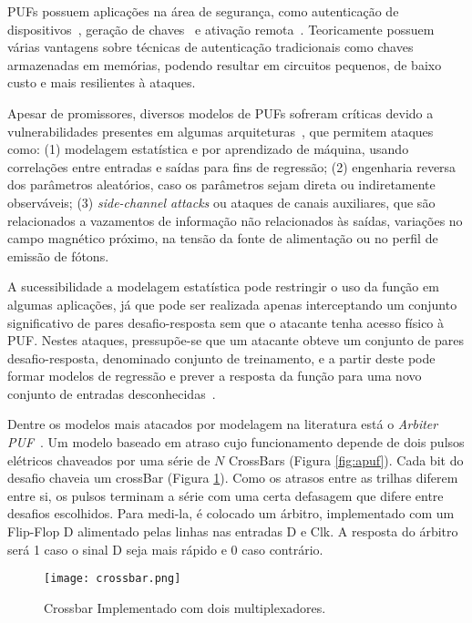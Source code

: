 \documentclass[pdftex,12pt]{article}
\begin{document}
\begin{spacing}{1.5}
PUFs possuem aplicações na área de segurança, como autenticação de dispositivos~\cite{SuhDevadas2007}, geração de chaves~\cite{LeeLGSDD_PUFSecretKey_VLSI04} e ativação remota~\cite{GassendCDD_CCSC02}. Teoricamente possuem várias vantagens sobre técnicas de autenticação tradicionais como chaves armazenadas em memórias, podendo resultar em circuitos pequenos, de baixo custo e mais resilientes à ataques.
    
Apesar de promissores, diversos modelos de PUFs sofreram críticas devido a vulnerabilidades presentes em algumas arquiteturas~\cite{PUFAnalysis, MajzoobiKP09, MajzoobiKP08}, que permitem ataques como: 
(1) modelagem estatística e por aprendizado de máquina, usando correlações entre entradas e saídas para fins de regressão;
(2) engenharia reversa dos parâmetros aleatórios, caso os parâmetros sejam direta ou indiretamente observáveis;
(3) \textit{side-channel attacks} ou ataques de canais auxiliares, que são relacionados a vazamentos de informação não relacionados às saídas, variações no campo magnético próximo, na tensão da fonte de alimentação ou no perfil de emissão de fótons.

A sucessibilidade a modelagem estatística pode restringir o uso da função em algumas aplicações, já que pode ser realizada apenas interceptando um conjunto significativo de pares desafio-resposta sem que o atacante tenha acesso físico à PUF. 
Nestes ataques, pressupõe-se que um atacante obteve um conjunto de pares desafio-resposta, denominado conjunto de treinamento, e a partir deste pode formar modelos de regressão e prever a resposta da função para uma novo conjunto de entradas desconhecidas~\cite{RuhrmairD13,RuhrmairSSDDS10}. 

Dentre os modelos mais atacados por modelagem na literatura está o \textit{Arbiter PUF}~\cite{GassendLCDD04}. Um modelo baseado em atraso cujo funcionamento depende de dois pulsos elétricos chaveados por uma série de $N$ CrossBars (Figura \ref{fig:apuf}). Cada bit do desafio chaveia um crossBar (Figura \ref{fig:crossbar}). Como os atrasos entre as trilhas diferem entre si, os pulsos terminam a série com uma certa defasagem que difere entre desafios escolhidos. Para medi-la, é colocado um árbitro, implementado com um Flip-Flop D alimentado pelas linhas nas entradas D e Clk. A resposta do árbitro será 1 caso o sinal D seja mais rápido e 0 caso contrário.

\FloatBarrier

\begin{figure}
\centering
\label{fig:crossbar}
\texttt{[image: crossbar.png]}
\caption{Crossbar Implementado com dois multiplexadores.}
\end{figure}


\end{spacing}
\end{document}
